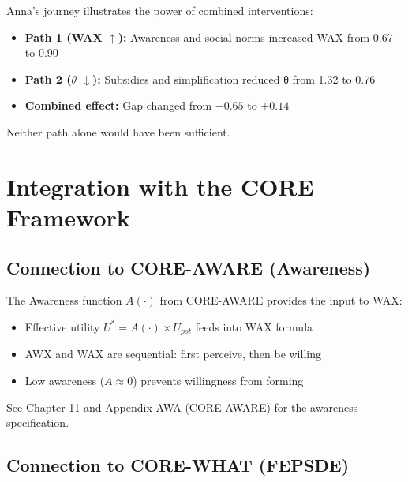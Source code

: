 \begin{intuition}
Anna's journey illustrates the power of combined interventions:
\begin{itemize}[nosep]
  \item \textbf{Path 1 (WAX $\uparrow$):} Awareness and social norms increased WAX from 0.67 to 0.90
  \item \textbf{Path 2 ($\theta$ $\downarrow$):} Subsidies and simplification reduced θ from 1.32 to 0.76
  \item \textbf{Combined effect:} Gap changed from $-0.65$ to $+0.14$
\end{itemize}
Neither path alone would have been sufficient.
\end{intuition}



\section{Integration with the CORE Framework}
\label{sec:12-integration}


\subsection{Connection to CORE-AWARE (Awareness)}

\begin{cross-reference}
The Awareness function $A(\cdot)$ from CORE-AWARE provides the input to WAX:
\begin{itemize}[nosep]
  \item Effective utility $U^* = A(\cdot) \times U_{pot}$ feeds into WAX formula
  \item AWX and WAX are sequential: first perceive, then be willing
  \item Low awareness ($A \approx 0$) prevents willingness from forming
\end{itemize}
See Chapter 11 and Appendix AWA (CORE-AWARE) for the awareness specification.
\end{cross-reference}

\subsection{Connection to CORE-WHAT (FEPSDE)}

